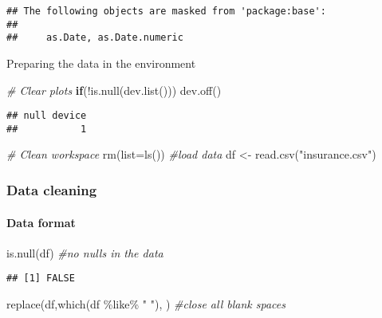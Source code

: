 \documentclass[
]{article}
\newenvironment{Shaded}{\begin{snugshade}}{\end{snugshade}}
\newcommand{\AttributeTok}[1]{\textcolor[rgb]{0.77,0.63,0.00}{#1}}
\newcommand{\CommentTok}[1]{\textcolor[rgb]{0.56,0.35,0.01}{\textit{#1}}}
\newcommand{\ControlFlowTok}[1]{\textcolor[rgb]{0.13,0.29,0.53}{\textbf{#1}}}
\newcommand{\FunctionTok}[1]{\textcolor[rgb]{0.00,0.00,0.00}{#1}}
\newcommand{\NormalTok}[1]{#1}
\newcommand{\OtherTok}[1]{\textcolor[rgb]{0.56,0.35,0.01}{#1}}
\newcommand{\SpecialCharTok}[1]{\textcolor[rgb]{0.00,0.00,0.00}{#1}}
\newcommand{\StringTok}[1]{\textcolor[rgb]{0.31,0.60,0.02}{#1}}
\begin{document}
\begin{verbatim}
## The following objects are masked from 'package:base':
## 
##     as.Date, as.Date.numeric
\end{verbatim}

Preparing the data in the environment

\begin{Shaded}
\begin{Highlighting}[]
\CommentTok{\# Clear plots}
\ControlFlowTok{if}\NormalTok{(}\SpecialCharTok{!}\FunctionTok{is.null}\NormalTok{(}\FunctionTok{dev.list}\NormalTok{())) }\FunctionTok{dev.off}\NormalTok{()}
\end{Highlighting}
\end{Shaded}

\begin{verbatim}
## null device 
##           1
\end{verbatim}

\begin{Shaded}
\begin{Highlighting}[]
\CommentTok{\# Clean workspace}
\FunctionTok{rm}\NormalTok{(}\AttributeTok{list=}\FunctionTok{ls}\NormalTok{())}
\CommentTok{\#load data}
\NormalTok{df }\OtherTok{\textless{}{-}} \FunctionTok{read.csv}\NormalTok{(}\StringTok{"insurance.csv"}\NormalTok{)}
\end{Highlighting}
\end{Shaded}

\hypertarget{data-cleaning}{%
\subsubsection{Data cleaning}\label{data-cleaning}}

\hypertarget{data-format}{%
\paragraph{Data format}\label{data-format}}

\begin{Shaded}
\begin{Highlighting}[]
\FunctionTok{is.null}\NormalTok{(df) }\CommentTok{\#no nulls in the data}
\end{Highlighting}
\end{Shaded}

\begin{verbatim}
## [1] FALSE
\end{verbatim}

\begin{Shaded}
\begin{Highlighting}[]
\FunctionTok{replace}\NormalTok{(df,}\FunctionTok{which}\NormalTok{(df }\SpecialCharTok{\%like\%} \StringTok{" "}\NormalTok{), }\StringTok{\textquotesingle{}\textquotesingle{}}\NormalTok{) }\CommentTok{\#close all blank spaces}
\end{Highlighting}
\end{Shaded}
\end{document}
